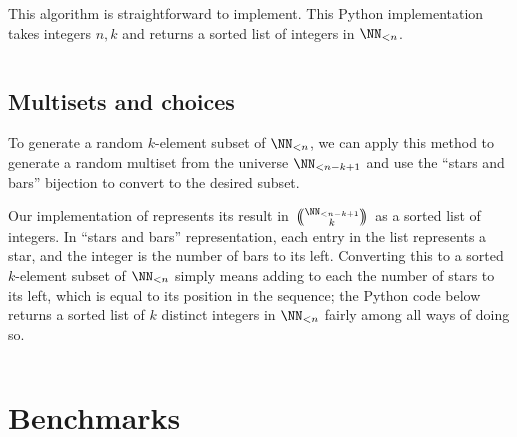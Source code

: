 \documentclass[letterpaper,luatex,11pt]{article}
\newcommand{\multichoose}[2]{
\left.\mathchoice
  {\left(\kern-0.48em\binom{#1}{#2}\kern-0.48em\right)}
  {\big(\kern-0.30em\binom{\smash{#1}}{\smash{#2}}\kern-0.30em\big)}
  {\left(\kern-0.30em\binom{\smash{#1}}{\smash{#2}}\kern-0.30em\right)}
  {\left(\kern-0.30em\binom{\smash{#1}}{\smash{#2}}\kern-0.30em\right)}
\right.}
\begin{document}
This algorithm is straightforward to implement. This Python implementation takes integers
$n, k$ and returns a sorted list of integers in \(\NN_{<n}\).

\inputminted{Python}{code/choose_multiset.py}

\subsection{Multisets and choices}

To generate a random \(k\)-element subset of \(\NN_{<n}\),
we can apply this method to generate a random multiset from the universe \(\NN_{<n-k + 1}\)
and use the ``stars and bars'' bijection to convert to the desired subset.

Our implementation of 
represents its result in \(\multichoose{\NN_{<n-k + 1}}{k}\) as a sorted list of integers.
In ``stars and bars'' representation,
each entry in the list represents a star, and the integer is the number of bars to its left.
Converting this to a sorted \(k\)-element subset of \(\NN_{<n}\) simply means adding to each
the number of stars to its left, which is equal to its position in the sequence; the Python code
below returns a sorted list of $k$ distinct integers in \(\NN_{<n}\) fairly among all ways
of doing so.

\inputminted{Python}{code/choose_binom.py}

\section{Benchmarks}

\printbibliography
\end{document}
